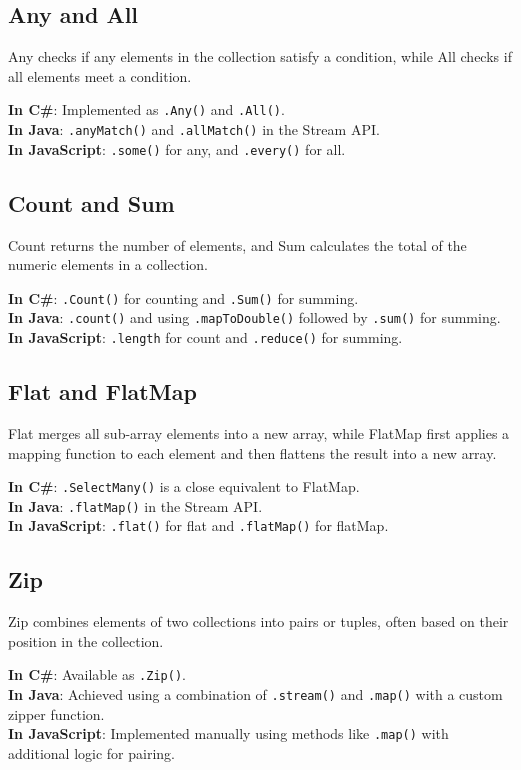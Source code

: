 \subsection*{Any and All}
Any checks if any elements in the collection satisfy a condition, while All checks if all elements meet a condition.

\textbf{In C\#}: Implemented as \texttt{.Any()} and \texttt{.All()}. \\
\textbf{In Java}: \texttt{.anyMatch()} and \texttt{.allMatch()} in the Stream API. \\
\textbf{In JavaScript}: \texttt{.some()} for any, and \texttt{.every()} for all.

\subsection*{Count and Sum}
Count returns the number of elements, and Sum calculates the total of the numeric elements in a collection.

\textbf{In C\#}: \texttt{.Count()} for counting and \texttt{.Sum()} for summing. \\
\textbf{In Java}: \texttt{.count()} and using \texttt{.mapToDouble()} followed by \texttt{.sum()} for summing. \\
\textbf{In JavaScript}: \texttt{.length} for count and \texttt{.reduce()} for summing.

\subsection*{Flat and FlatMap}
Flat merges all sub-array elements into a new array, while FlatMap first applies a mapping function to each element and then flattens the result into a new array.

\textbf{In C\#}: \texttt{.SelectMany()} is a close equivalent to FlatMap. \\
\textbf{In Java}: \texttt{.flatMap()} in the Stream API. \\
\textbf{In JavaScript}: \texttt{.flat()} for flat and \texttt{.flatMap()} for flatMap.

\subsection*{Zip}
Zip combines elements of two collections into pairs or tuples, often based on their position in the collection.

\textbf{In C\#}: Available as \texttt{.Zip()}. \\
\textbf{In Java}: Achieved using a combination of \texttt{.stream()} and \texttt{.map()} with a custom zipper function. \\
\textbf{In JavaScript}: Implemented manually using methods like \texttt{.map()} with additional logic for pairing.

